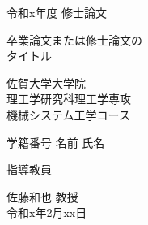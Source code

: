 \thispagestyle{empty}
\vspace{2em}
{\Huge
	\begin{center}
		令和x年度\hspace{1em} 修士論文
	\end{center}
}
\vspace{2em}
{\Huge
	\begin{center}
		卒業論文または修士論文の\\
		タイトル
	\end{center}
}
\vspace{13em}

{\Huge
	\begin{center}
		佐賀大学大学院\\
		理工学研究科理工学専攻\\
		機械システム工学コース\\
		\vspace{2em}

			学籍番号  名前 氏名

	\end{center}
}
\vspace{2em}

\begin{center}
{\LARGE
指導教員

佐藤和也 教授 \\
\vspace{1em}
令和x年2月xx日
}
\end{center}
\clearpage